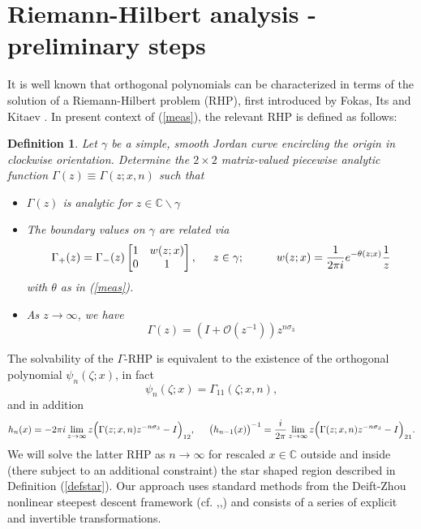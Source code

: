 \documentclass[10pt,oneside,reqno]{amsart}
\numberwithin{equation}{section}
\newtheorem{definition}[theorem]{Definition}
\def\be{\begin{equation}}
\def\ee{\end{equation}}
\def\eqref#1{(\ref{#1})}
\begin{document}
\section{Riemann-Hilbert analysis - preliminary steps}\label{sec2}
It is well known that orthogonal polynomials can be characterized in terms of the solution of a Riemann-Hilbert problem (RHP), first introduced by Fokas, Its and Kitaev \cite{FIK}. 
In present context of \eqref{meas}, the relevant RHP is defined as follows:
\begin{definition} 
Let $\gamma$ be a simple, smooth Jordan curve encircling the origin in clockwise orientation. 
Determine the $2\times 2$ matrix-valued piecewise analytic function $\Gamma(z)\equiv\Gamma(z;x,n)$ such that
 \begin{itemize}
  \item $\Gamma(z)$ is analytic for $z\in\mathbb{C}\backslash\gamma$
  \item The boundary values on $\gamma$ are related via
  \be\label{j1}
    \Gamma_+(z) = \Gamma_-(z)\begin{bmatrix}
                                          1 & w(z;x)\\
0 & 1\\
                                         \end{bmatrix},\hspace{0.5cm}z\in\gamma;\hspace{1cm} w(z;x) =\frac{1}{2\pi i}e^{-\theta(z;x)}\frac{1}{z}
  \ee
  with $\theta$ as in \eqref{meas}.
  \item As $z\rightarrow\infty$, we have
  \be\label{asy1}
    \Gamma(z) = \left(I+\mathcal O\left(z^{-1}\right)\right)z^{n\sigma_3}
  \ee
 \end{itemize}
\end{definition}
The solvability of the $\Gamma$-RHP is equivalent to the existence of the orthogonal polynomial $\psi_{n}(\zeta;x)$, in fact \cite{D}
\begin{equation}\label{Drel}
 \psi_n(\zeta;x) = \Gamma_{11}(\zeta;x,n),
\end{equation}
and in addition
\begin{equation*}
 h_n(x) = -2\pi i\lim_{z\rightarrow\infty}z\Big(\Gamma(z;x,n)z^{-n\sigma_3}-I\Big)_{12},\hspace{0.5cm}
 \big(h_{n-1}(x)\big)^{-1}=\frac{i}{2\pi}\lim_{z\rightarrow\infty}z\Big(\Gamma(z;x,n)z^{-n\sigma_3}-I\Big)_{21}.
\end{equation*}
We will solve the latter RHP as $n\rightarrow\infty$ for rescaled $x\in\mathbb{C}$  outside and inside (there subject to an additional constraint) the star shaped region described in Definition \eqref{defstar}. Our approach uses standard methods from
the Deift-Zhou nonlinear steepest descent framework (cf. \cite{DZ},\cite{DKM},\cite{DKMVZ}) and consists of a series of explicit and invertible transformations.
%
%
\end{document}
